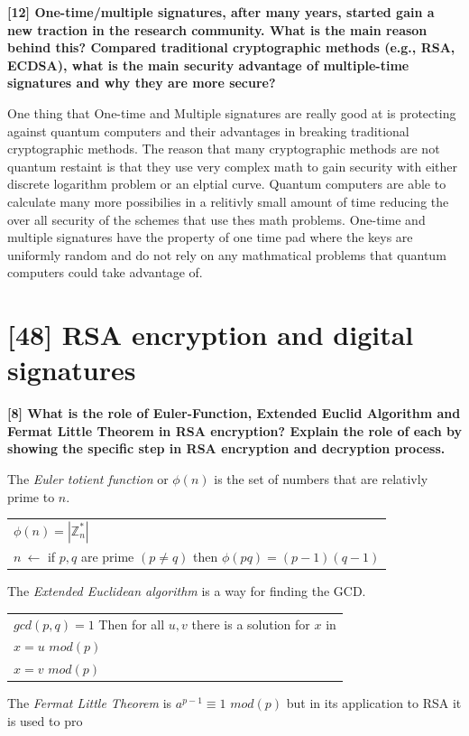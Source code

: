 \documentclass[letterpaper,11pt,notitlepage,fleqn]{article}
\begin{document}
\noindent \textbf{[12] One-time/multiple signatures, after many years, started gain a new traction in  the  research  community.  What  is  the  main  reason  behind  this?  Compared traditional cryptographic methods  (e.g., RSA, ECDSA), what  is  the main security advantage of multiple-time signatures and why they are more secure?}  

One thing that One-time and Multiple signatures are really good at is protecting against quantum computers and their advantages in breaking traditional cryptographic methods. The reason that many cryptographic methods are not quantum restaint is that they use very complex math to gain security with either discrete logarithm problem or an elptial curve. Quantum computers are able to calculate many more possibilies in a relitivly small amount of time reducing the over all
security of the schemes that use thes math problems. One-time and multiple signatures have the property of one time pad where the keys are uniformly random and do not rely on any mathmatical problems that quantum computers could take advantage of. 

\section{[48] RSA encryption and digital signatures}

\noindent \textbf{[8]  What  is  the  role  of  Euler-Function,  Extended  Euclid  Algorithm  and  Fermat Little  Theorem  in  RSA  encryption?  Explain  the  role  of  each  by  showing  the specific step in RSA encryption and decryption process.}

The \textit{Euler totient function} or $\phi(n)$ is the set of numbers that are relativly prime to $n$. \\
\begin{center}
    \begin{tabular}{l}
        $\phi(n) = |\mathbb{Z}_{n}^{*}|$ \\
        $n\ \leftarrow$ if $p,q$ are prime $(p \neq q)$ then $\phi(pq) = (p-1)(q-1)$
    \end{tabular}
\end{center}

The \textit{Extended Euclidean algorithm} is a way for finding the GCD.\\
\begin{center}
    \begin{tabular}{l}
        $gcd(p,q) = 1$ Then for all $u,v$ there is a solution for $x$ in \\
        $x = u$ $mod(p)$ \\ 
        $x = v$ $mod(p)$ 
    \end{tabular}
\end{center}
The \textit{Fermat Little Theorem} is $a^{p-1} \equiv 1$ $mod(p)$ but in its application to RSA it is used to pro
\end{document}
